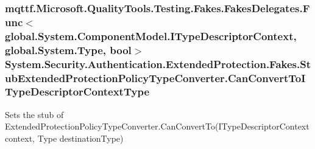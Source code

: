 \hypertarget{class_system_1_1_security_1_1_authentication_1_1_extended_protection_1_1_fakes_1_1_stub_extendedf67afed15bbc0df07bfc91316f6f81f0_acc95f33faea82ce618c5644397628fb4}{
\subsubsection[{Can\-Convert\-To\-I\-Type\-Descriptor\-Context\-Type}]{\setlength{\rightskip}{0pt plus 5cm}mqttf.\-Microsoft.\-Quality\-Tools.\-Testing.\-Fakes.\-Fakes\-Delegates.\-Func$<$global.\-System.\-Component\-Model.\-I\-Type\-Descriptor\-Context, global.\-System.\-Type, bool$>$ System.\-Security.\-Authentication.\-Extended\-Protection.\-Fakes.\-Stub\-Extended\-Protection\-Policy\-Type\-Converter.\-Can\-Convert\-To\-I\-Type\-Descriptor\-Context\-Type}}\label{class_system_1_1_security_1_1_authentication_1_1_extended_protection_1_1_fakes_1_1_stub_extendedf67afed15bbc0df07bfc91316f6f81f0_acc95f33faea82ce618c5644397628fb4}


Sets the stub of Extended\-Protection\-Policy\-Type\-Converter.\-Can\-Convert\-To(\-I\-Type\-Descriptor\-Context context, Type destination\-Type)


